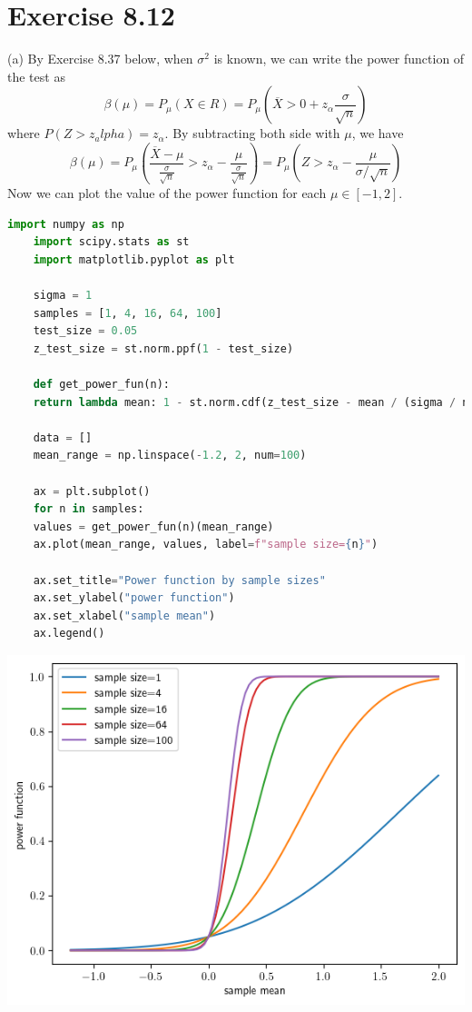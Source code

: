 \documentclass[12pt]{article}
\begin{document}
\section*{Exercise 8.12}
(a) By Exercise 8.37 below, when $\sigma^2$ is known, we can write the power function of the test as 
$$ \beta(\mu) = P_\mu(X \in R) = P_\mu(\overline{X} > 0 + z_\alpha \frac{\sigma}{\sqrt{n}}) $$
where $P(Z > z_alpha) = z_\alpha$. By subtracting both side with $\mu$, we have 
$$ \beta(\mu) =  P_\mu( \frac{\overline{X} - \mu}{ \frac{\sigma}{\sqrt{n}}} > z_\alpha - \frac{\mu}{ \frac{\sigma}{\sqrt{n}}}) = P_\mu(Z > z_\alpha - \frac{\mu}{ \sigma / \sqrt{n}})$$
Now we can plot the value of the power function for each $\mu \in [-1, 2]$.

\begin{lstlisting}[language=Python]
	import numpy as np
	import scipy.stats as st
	import matplotlib.pyplot as plt
	
	sigma = 1
	samples = [1, 4, 16, 64, 100]
	test_size = 0.05
	z_test_size = st.norm.ppf(1 - test_size)
	
	def get_power_fun(n):
	return lambda mean: 1 - st.norm.cdf(z_test_size - mean / (sigma / np.sqrt(n)))
	
	data = []
	mean_range = np.linspace(-1.2, 2, num=100)
	
	ax = plt.subplot()
	for n in samples:
	values = get_power_fun(n)(mean_range)
	ax.plot(mean_range, values, label=f"sample size={n}")
	
	ax.set_title="Power function by sample sizes"
	ax.set_ylabel("power function")
	ax.set_xlabel("sample mean")
	ax.legend()
\end{lstlisting}
\includegraphics{fig_ch_08_12_a}
\end{document}
